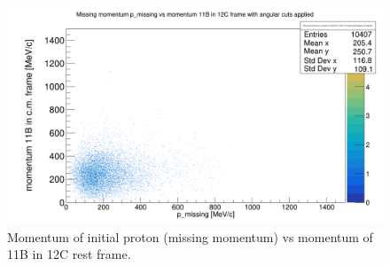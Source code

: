\documentclass{report}
\begin{document}
\begin{figure}[hbt!]
  \includegraphics[width=\linewidth]{11b_mom_vs_missing_mom.png}
  \caption{Momentum of initial proton (missing momentum) vs momentum of 11B in 12C rest frame.}
  \label{fig:gamma_angular_and_mult_cut}
\end{figure}
\end{document}
